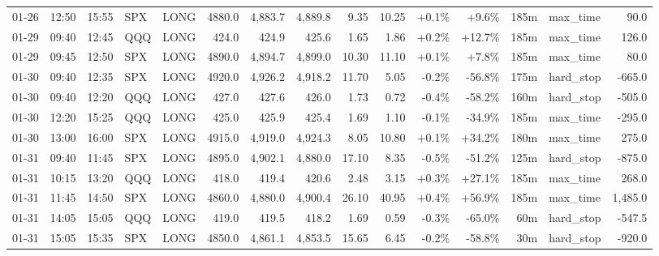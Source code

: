 \documentclass[11pt,a4paper,twoside]{article}
\begin{document}
\begin{landscape}
\begin{center}
\begin{longtable}{>{\color{txtmain}}l l l l l r r r r r r r r >{\color{txtmain}}l r}
01-26 & 12:50 & 15:55 & SPX & LONG & 4880.0 & 4,883.7 & 4,889.8 & 9.35 & 10.25 & \textcolor{wingreen}{+0.1\%} & \textcolor{wingreen}{+9.6\%} & 185m & max\_time & \textcolor{wingreen}{90.0} \\
01-29 & 09:40 & 12:45 & QQQ & LONG & 424.0 & 424.9 & 425.6 & 1.65 & 1.86 & \textcolor{wingreen}{+0.2\%} & \textcolor{wingreen}{+12.7\%} & 185m & max\_time & \textcolor{wingreen}{126.0} \\
01-29 & 09:45 & 12:50 & SPX & LONG & 4890.0 & 4,894.7 & 4,899.0 & 10.30 & 11.10 & \textcolor{wingreen}{+0.1\%} & \textcolor{wingreen}{+7.8\%} & 185m & max\_time & \textcolor{wingreen}{80.0} \\
01-30 & 09:40 & 12:35 & SPX & LONG & 4920.0 & 4,926.2 & 4,918.2 & 11.70 & 5.05 & \textcolor{lossred}{-0.2\%} & \textcolor{lossred}{-56.8\%} & 175m & hard\_stop & \textcolor{lossred}{-665.0} \\
01-30 & 09:40 & 12:20 & QQQ & LONG & 427.0 & 427.6 & 426.0 & 1.73 & 0.72 & \textcolor{lossred}{-0.4\%} & \textcolor{lossred}{-58.2\%} & 160m & hard\_stop & \textcolor{lossred}{-505.0} \\
01-30 & 12:20 & 15:25 & QQQ & LONG & 425.0 & 425.9 & 425.4 & 1.69 & 1.10 & \textcolor{lossred}{-0.1\%} & \textcolor{lossred}{-34.9\%} & 185m & max\_time & \textcolor{lossred}{-295.0} \\
01-30 & 13:00 & 16:00 & SPX & LONG & 4915.0 & 4,919.0 & 4,924.3 & 8.05 & 10.80 & \textcolor{wingreen}{+0.1\%} & \textcolor{wingreen}{+34.2\%} & 180m & max\_time & \textcolor{wingreen}{275.0} \\
01-31 & 09:40 & 11:45 & SPX & LONG & 4895.0 & 4,902.1 & 4,880.0 & 17.10 & 8.35 & \textcolor{lossred}{-0.5\%} & \textcolor{lossred}{-51.2\%} & 125m & hard\_stop & \textcolor{lossred}{-875.0} \\
01-31 & 10:15 & 13:20 & QQQ & LONG & 418.0 & 419.4 & 420.6 & 2.48 & 3.15 & \textcolor{wingreen}{+0.3\%} & \textcolor{wingreen}{+27.1\%} & 185m & max\_time & \textcolor{wingreen}{268.0} \\
01-31 & 11:45 & 14:50 & SPX & LONG & 4860.0 & 4,880.0 & 4,900.4 & 26.10 & 40.95 & \textcolor{wingreen}{+0.4\%} & \textcolor{wingreen}{+56.9\%} & 185m & max\_time & \textcolor{wingreen}{1,485.0} \\
01-31 & 14:05 & 15:05 & QQQ & LONG & 419.0 & 419.5 & 418.2 & 1.69 & 0.59 & \textcolor{lossred}{-0.3\%} & \textcolor{lossred}{-65.0\%} & 60m & hard\_stop & \textcolor{lossred}{-547.5} \\
01-31 & 15:05 & 15:35 & SPX & LONG & 4850.0 & 4,861.1 & 4,853.5 & 15.65 & 6.45 & \textcolor{lossred}{-0.2\%} & \textcolor{lossred}{-58.8\%} & 30m & hard\_stop & \textcolor{lossred}{-920.0} \\

\end{longtable}
\end{center}
\end{landscape}
\end{document}
